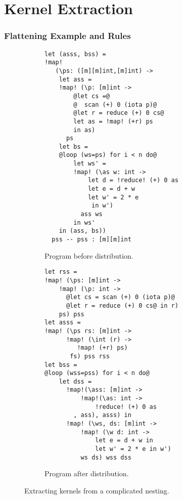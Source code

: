 \chapter{Kernel Extraction}


\subsection{Flattening Example and Rules}
\label{subsec:kernel-extraction}

\begin{figure}
\begin{subfigure}{0.48\columnwidth}
\begin{lstlisting}[basicstyle=\sffamily\footnotesize]
let (asss, bss) =
!map!
   (\ps: ([m][m]int,[m]int) ->
    let ass =
    !map! (\p: [m]int ->
        @let cs =@
        @  scan (+) 0 (iota p)@
        @let r = reduce (+) 0 cs@
        let as = !map! (+r) ps
        in as)
      ps
    let bs =
    @loop (ws=ps) for i < n do@
        let ws' =
        !map! (\as w: int ->
            let d = !reduce! (+) 0 as
            let e = d + w
            let w' = 2 * e
             in w')
          ass ws
        in ws'
    in (ass, bs))
  pss -- pss : [m][m]int
\end{lstlisting}
\caption{Program before distribution.}
\label{fig:before-distrib}
\end{subfigure}
\begin{subfigure}{0.49\columnwidth}
\begin{lstlisting}[basicstyle=\sffamily\footnotesize]
let rss =
!map! (\ps: [m]int ->
    !map! (\p: int ->
      @let cs = scan (+) 0 (iota p)@
      @let r = reduce (+) 0 cs@ in r)
    ps) pss
let asss =
!map! (\ps rs: [m]int ->
      !map! (\int (r) ->
         !map! (+r) ps)
       fs) pss rss
let bss =
@loop (wss=pss) for i < n do@
    let dss =
      !map!(\ass: [m]int ->
          !map!(\as: int ->
              !reduce! (+) 0 as
        , ass), asss) in
      !map! (\ws, ds: [m]int ->
          !map! (\w d: int ->
              let e = d + w in
              let w' = 2 * e in w')
          ws ds) wss dss
\end{lstlisting}
\caption{Program after distribution.}
\label{fig:after-result}
\end{subfigure}
\caption{Extracting kernels from a complicated nesting.}
\end{figure}



